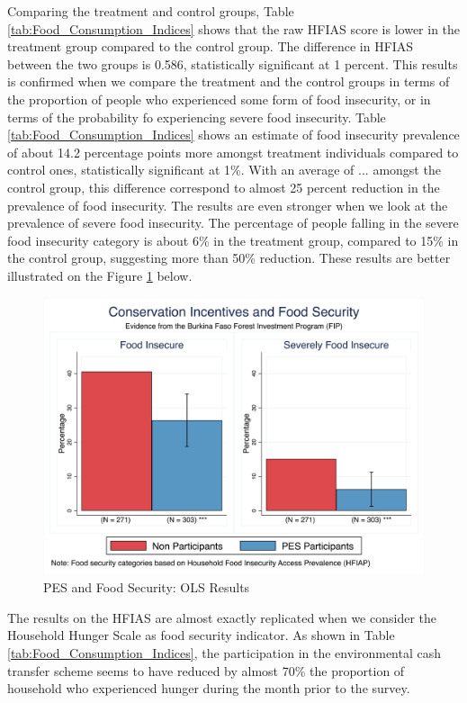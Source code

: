 \documentclass[preprint,12pt]{elsarticle}
\begin{document}
Comparing the treatment and control groups, Table \ref*{tab:Food_Consumption_Indices} shows that the raw HFIAS score is lower in the treatment group compared to the control group. The difference in HFIAS between the two groups is 0.586, statistically significant at 1 percent. This results is confirmed when we compare the treatment and the control groups in terms of the proportion of people who experienced some form of food insecurity, or in terms of the probability fo experiencing severe food insecurity. Table \ref*{tab:Food_Consumption_Indices} shows an estimate of food insecurity prevalence of about 14.2 percentage points more amongst treatment individuals compared to control ones, statistically significant at 1\%. With an average of ... amongst the control group, this difference correspond to almost 25 percent reduction in the prevalence of food insecurity. The results are even stronger when we look at the prevalence of severe food insecurity. The percentage of people falling in the severe food insecurity category is about 6\% in the treatment group, compared to 15\% in the control group, suggesting more than 50\% reduction. These results are better illustrated on the Figure \ref*{fig:HFIAS_impact} below.  \\

\begin{figure}[ht!]
	\footnotesize
	\centering
	\caption{PES and Food Security: OLS Results \label{fig:HFIAS_impact}}
	\includegraphics[width=0.9\linewidth]{Food_Insecure_graph.png}
\end{figure}
\FloatBarrier

The results on the HFIAS are almost exactly replicated when we consider the Household Hunger Scale as food security indicator. As shown in Table \ref*{tab:Food_Consumption_Indices}, the participation in the environmental cash transfer scheme seems to have reduced by almost 70\% the proportion of household who experienced hunger during the month prior to the survey. 
\end{document}
